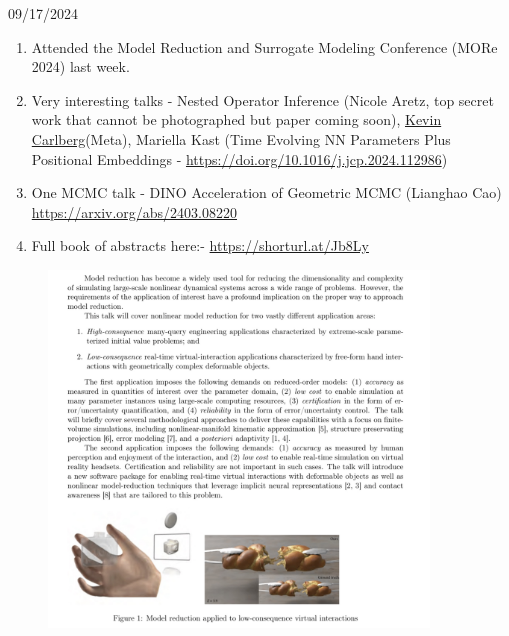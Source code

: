 \documentclass[usenames,dvipsnames]{beamer}
\theoremstyle{definition}
\begin{document}
%     


\begin{frame}{09/17/2024}

\begin{enumerate}
    \item Attended the Model Reduction and Surrogate Modeling Conference (MORe 2024) last week.
    
    \item Very interesting talks - Nested Operator Inference (Nicole Aretz, top secret work that cannot be photographed but paper coming soon), \href{https://kevintcarlberg.net/}{Kevin Carlberg}(Meta), Mariella Kast (Time Evolving NN Parameters Plus Positional Embeddings - \url{https://doi.org/10.1016/j.jcp.2024.112986})
    
    \item One MCMC talk - DINO Acceleration of Geometric MCMC (Lianghao Cao) \url{https://arxiv.org/abs/2403.08220}

    \item Full book of abstracts here:- \url{https://shorturl.at/Jb8Ly}
    
\end{enumerate}
\end{frame}

\begin{frame}
    \begin{figure}[H]
        \centering
        \includegraphics[width=0.9\textwidth]{carlberg_talk_outline.jpg}
    \end{figure}
\end{frame}
\end{document}
